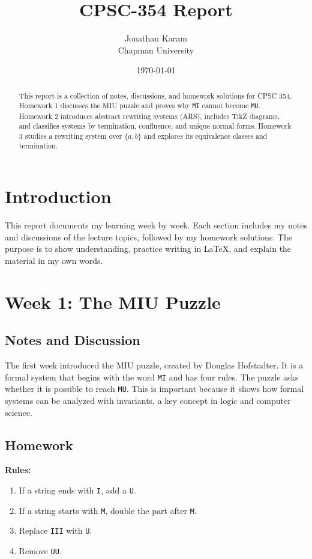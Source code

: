 \documentclass{article}
\title{CPSC-354 Report}
\author{Jonathan Karam \\ Chapman University}
\date{\today}
\theoremstyle{theorem}
\theoremstyle{definition}
\theoremstyle{remark}
\begin{document}
\maketitle

\begin{abstract}
This report is a collection of notes, discussions, and homework solutions for CPSC 354. 
Homework 1 discusses the MIU puzzle and proves why \texttt{MI} cannot become \texttt{MU}. 
Homework 2 introduces abstract rewriting systems (ARS), includes TikZ diagrams, and classifies systems by termination, confluence, and unique normal forms. 
Homework 3 studies a rewriting system over $\{a,b\}$ and explores its equivalence classes and termination.
\end{abstract}

\tableofcontents

\section{Introduction}
This report documents my learning week by week. 
Each section includes my notes and discussions of the lecture topics, followed by my homework solutions.
The purpose is to show understanding, practice writing in \LaTeX{}, and explain the material in my own words.

\section{Week 1: The MIU Puzzle}

\subsection{Notes and Discussion}
The first week introduced the MIU puzzle, created by Douglas Hofstadter. 
It is a formal system that begins with the word \texttt{MI} and has four rules. 
The puzzle asks whether it is possible to reach \texttt{MU}. 
This is important because it shows how formal systems can be analyzed with invariants, a key concept in logic and computer science.

\subsection{Homework}
\textbf{Rules:}
\begin{enumerate}
  \item If a string ends with \texttt{I}, add a \texttt{U}.
  \item If a string starts with \texttt{M}, double the part after \texttt{M}.
  \item Replace \texttt{III} with \texttt{U}.
  \item Remove \texttt{UU}.
\end{enumerate}
\end{document}
